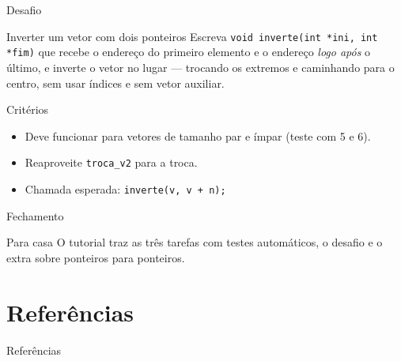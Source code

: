 \documentclass[aspectratio=169]{beamer}
\begin{document}
\begin{frame}{Desafio}
  \begin{block}{Inverter um vetor com dois ponteiros}
    Escreva \texttt{void inverte(int *ini, int *fim)} que recebe o endereço do
    primeiro elemento e o endereço \emph{logo após} o último, e inverte o
    vetor no lugar --- trocando os extremos e caminhando para o centro, sem
    usar índices e sem vetor auxiliar.
  \end{block}
  \begin{exampleblock}{Critérios}
    \begin{itemize}
      \item Deve funcionar para vetores de tamanho par e ímpar (teste com 5 e 6).
      \item Reaproveite \texttt{troca\_v2} para a troca.
      \item Chamada esperada: \texttt{inverte(v, v + n);}
    \end{itemize}
  \end{exampleblock}
\end{frame}

\begin{frame}{Fechamento}
  \begin{center}
  \end{center}
  \begin{exampleblock}{Para casa}
    O tutorial traz as três tarefas com testes automáticos, o desafio e o
    extra sobre ponteiros para ponteiros.
  \end{exampleblock}
\end{frame}

\section*{Referências}
\begin{frame}[allowframebreaks]{Referências}
  \footnotesize
  \nocite{kernighan1989c,schildt1997completo,tenenbaum1995estruturas,%
    backes2013linguagem,feofiloff2009algoritmos,deitel2011como}
  
  
\end{frame}
\end{document}
